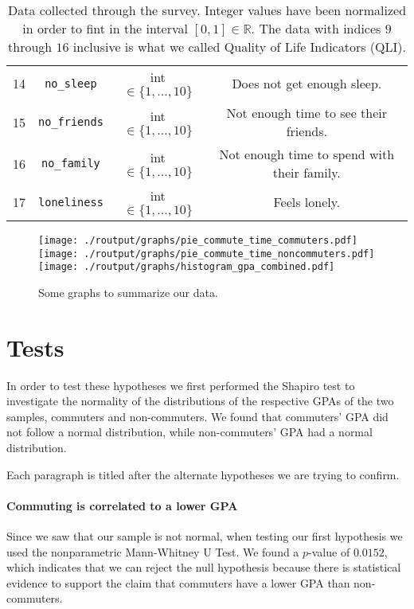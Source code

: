 \documentclass[11pt]{extarticle}
\numberwithin{table}{section}
\numberwithin{figure}{section}
\newcommand{\R}{\mathds{R}}
\numberwithin{equation}{section}
\begin{document}
\begin{table}[!ht]
\begin{tabular}{|c|c|c|c|}
		14         & \texttt{no\_sleep}               & int $\in \{1, \dots, 10\}$ & Does not get enough sleep.                          \\
		15         & \texttt{no\_friends}             & int $\in \{1, \dots, 10\}$ & Not enough time to see their friends.               \\
		16         & \texttt{no\_family}              & int $\in \{1, \dots, 10\}$ & Not enough time to spend with their family.         \\
		17         & \texttt{loneliness}              & int $\in \{1, \dots, 10\}$ & Feels lonely.                                       \\
		\hline
	\end{tabular}
	\caption{
		Data collected through the survey.
		Integer values have been normalized in order to fint in the interval $[0,1] \in \R$.
		The data with indices $9$ through $16$ inclusive is what we called Quality of Life Indicators (QLI).
	}
	\label{table:data}
\end{table}
\begin{figure}[!ht]
	\centering
	{\texttt{[image: ./routput/graphs/pie\_commute\_time\_commuters.pdf]}}
	{\texttt{[image: ./routput/graphs/pie\_commute\_time\_noncommuters.pdf]}}
	{\texttt{[image: ./routput/graphs/histogram\_gpa\_combined.pdf]}}
	\caption{Some graphs to summarize our data.}
\end{figure}

\section{Tests}
\label{sec:tests}

In order to test these hypotheses we first performed the Shapiro test to investigate the normality
of the distributions of the respective GPAs of the two samples, commuters and non-commuters.
We found that commuters' GPA did not follow a normal distribution, while non-commuters' GPA
had a normal distribution.

Each paragraph is titled after the alternate hypotheses we are trying to confirm.

\paragraph{Commuting is correlated to a lower GPA}
Since we saw that our sample is not normal,
when testing our first hypothesis we used the nonparametric Mann-Whitney U Test.
We found a $p$-value of $0.0152$, which indicates that we can reject the null hypothesis because
there is statistical evidence to support the claim that commuters have a lower GPA than non-commuters.
\end{document}
